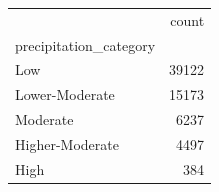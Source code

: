 \begin{tabular}{lr}
\toprule
 & count \\
precipitation_category &  \\
\midrule
Low & 39122 \\
Lower-Moderate & 15173 \\
Moderate & 6237 \\
Higher-Moderate & 4497 \\
High & 384 \\
\bottomrule
\end{tabular}
